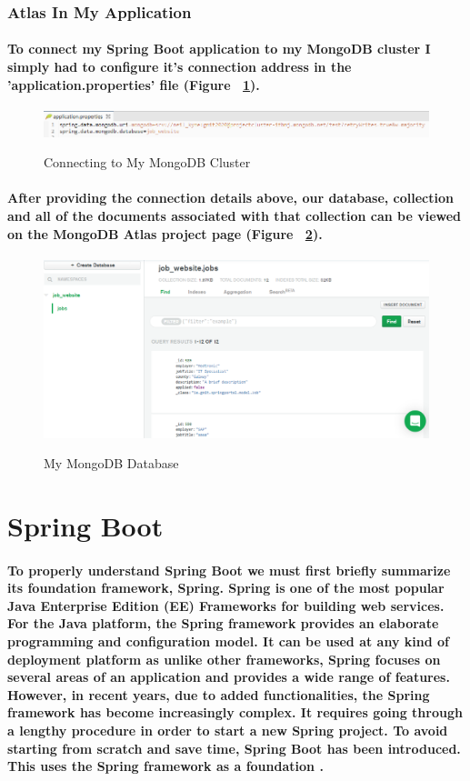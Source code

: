 \subsubsection{Atlas In My Application}
\paragraph{To connect my Spring Boot application to my MongoDB cluster I simply had to configure it's connection address in the 'application.properties' file (Figure ~\ref{mongo5_label}). }
\begin{figure}[ht]
    \centering
    \includegraphics[scale=0.515]{Images/mongo5.png} 
    \label{mongo5_label}
    \caption{Connecting to My MongoDB Cluster}
\end{figure}
\paragraph{After providing the connection details above, our database, collection and all of the documents associated with that collection can be viewed on the MongoDB Atlas project page (Figure ~\ref{mongo1_label}).}
\begin{figure}[ht]
    \centering
    \includegraphics[scale=0.4]{Images/mongo1.png} 
    \label{mongo1_label}
    \caption{My MongoDB Database}
\end{figure}

\section{Spring Boot}
\paragraph{To properly understand Spring Boot we must first briefly summarize its foundation framework, Spring. Spring is one of the most popular Java Enterprise Edition (EE) Frameworks for building  web services. For the Java platform, the Spring framework provides an elaborate programming and configuration model. It can be used at any kind of deployment platform as unlike other frameworks, Spring focuses on several areas of an application and provides a wide range of features. However, in recent years, due to added functionalities, the Spring framework has become increasingly complex. It requires going through a lengthy procedure in order to start a new Spring project. To avoid starting from scratch and save time, Spring Boot has been introduced. This uses the Spring framework as a foundation \cite{DZone:Spring}.}
